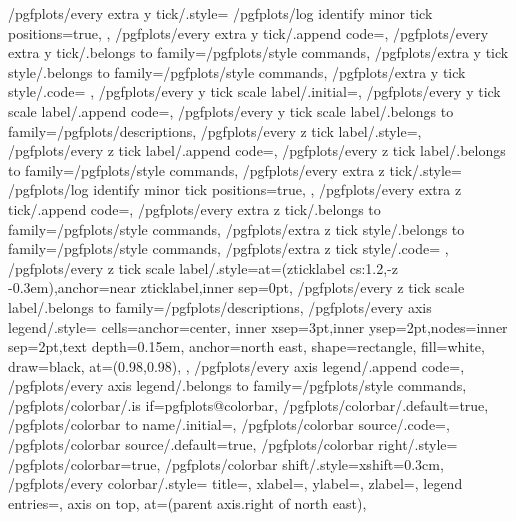 {	/pgfplots/every extra y tick/.style={
		/pgfplots/log identify minor tick positions=true,
	},
	/pgfplots/every extra y tick/.append code={},
	/pgfplots/every extra y tick/.belongs to family=/pgfplots/style commands,
	/pgfplots/extra y tick style/.belongs to family=/pgfplots/style commands,
	/pgfplots/extra y tick style/.code={%
	},
	/pgfplots/every y tick scale label/.initial=,%
	/pgfplots/every y tick scale label/.append code={},
	/pgfplots/every y tick scale label/.belongs to family=/pgfplots/descriptions,
	/pgfplots/every z tick label/.style={},
	/pgfplots/every z tick label/.append code={},
	/pgfplots/every z tick label/.belongs to family=/pgfplots/style commands,
	/pgfplots/every extra z tick/.style={
		/pgfplots/log identify minor tick positions=true,
	},
	/pgfplots/every extra z tick/.append code={},
	/pgfplots/every extra z tick/.belongs to family=/pgfplots/style commands,
	/pgfplots/extra z tick style/.belongs to family=/pgfplots/style commands,
	/pgfplots/extra z tick style/.code={%
	},
	/pgfplots/every z tick scale label/.style={at={(zticklabel cs:1.2,-\pgfplotsvalueoflargesttickdimen z -0.3em)},anchor=near zticklabel,inner sep=0pt},
	/pgfplots/every z tick scale label/.belongs to family=/pgfplots/descriptions,
	/pgfplots/every axis legend/.style={%
		cells={anchor=center},
		inner xsep=3pt,inner ysep=2pt,nodes={inner sep=2pt,text depth=0.15em},
		anchor=north east,%
		shape=rectangle,%
		fill=white,%
		draw=black,
		at={(0.98,0.98)},
	},
	/pgfplots/every axis legend/.append code={},
	/pgfplots/every axis legend/.belongs to family=/pgfplots/style commands,
	/pgfplots/colorbar/.is if=pgfplots@colorbar,
	/pgfplots/colorbar/.default=true,
	/pgfplots/colorbar to name/.initial=,
	/pgfplots/colorbar source/.code={},
	/pgfplots/colorbar source/.default=true,
	/pgfplots/colorbar right/.style={%
		/pgfplots/colorbar=true,
		/pgfplots/colorbar shift/.style={xshift=0.3cm},
		/pgfplots/every colorbar/.style={%
			title=,
			xlabel=,
			ylabel=,
			zlabel=,
			legend entries=,
			axis on top,
			at={(parent axis.right of north east)},
}}}
